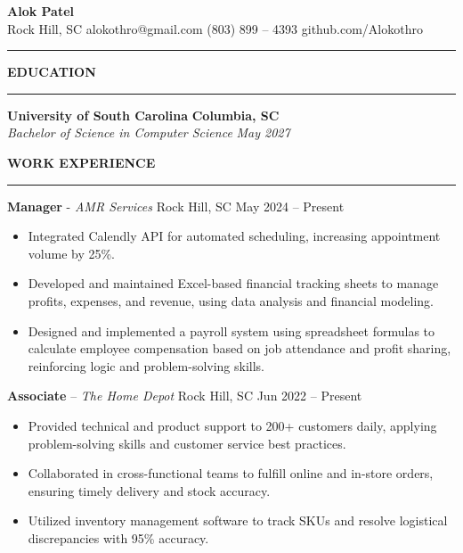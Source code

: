 \documentclass[10.5pt, letterpaper]{article}
\newcommand{\ressection}[1]{%
  \vspace{6pt}
  \noindent\textbf{#1}
  \vspace{1pt}
  \hrule
  \vspace{4pt}
}
\begin{document}
\begin{center}
  {\large\textbf{Alok Patel}}\\[2pt]
  Rock Hill, SC \textbar{} alokothro@gmail.com \textbar{} (803) 899 -- 4393 \textbar{} github.com/Alokothro
\end{center}

\vspace{4pt}
\hrule
\vspace{4pt}

\ressection{EDUCATION}

\noindent\textbf{University of South Carolina} \hfill \textbf{Columbia, SC}\\
\textit{Bachelor of Science in Computer Science} \hfill \textit{May 2027}

\vspace{8pt}

\ressection{WORK EXPERIENCE}

\noindent\textbf{Manager} - \textit{AMR Services} \textbar{} Rock Hill, SC \textbar{} May 2024 -- Present
\begin{itemize}[leftmargin=1.5em, itemsep=1pt, topsep=2pt]
  \item Integrated Calendly API for automated scheduling, increasing appointment volume by 25\%.
  \item Developed and maintained Excel-based financial tracking sheets to manage profits, expenses, and revenue, using data analysis and financial modeling.
  \item Designed and implemented a payroll system using spreadsheet formulas to calculate employee compensation based on job attendance and profit sharing, reinforcing logic and problem-solving skills.
\end{itemize}

\vspace{4pt}
\noindent\textbf{Associate} -- \textit{The Home Depot} \textbar{} Rock Hill, SC \textbar{} Jun 2022 -- Present
\begin{itemize}[leftmargin=1.5em, itemsep=1pt, topsep=2pt]
  \item Provided technical and product support to 200+ customers daily, applying problem-solving skills and customer service best practices.
  \item Collaborated in cross-functional teams to fulfill online and in-store orders, ensuring timely delivery and stock accuracy.
  \item Utilized inventory management software to track SKUs and resolve logistical discrepancies with 95\% accuracy.
\end{itemize}
\end{document}
